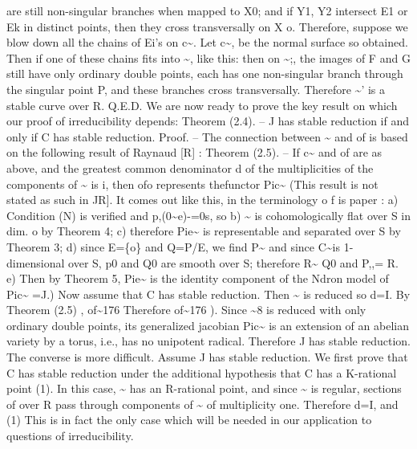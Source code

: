 \documentclass[11pt]{article}
\theoremstyle{plain}
\theoremstyle{definition}
\theoremstyle{remark}
\begin{document}
are still non-singular branches when mapped to X0; and if Y1, Y2 intersect E1 or Ek in distinct points, then they cross transversally on X o. Therefore, suppose we blow down all the chains of Ei's on c\textasciitilde{}. Let c\textasciitilde{}, be the normal surface so obtained. Then if one of these chains fits into \textasciitilde{}, like this: then on \textasciitilde{};, the images of F and G still have only ordinary double points, each has one non-singular branch through the singular point P, and these branches cross transversally. Therefore \textasciitilde{}' is a stable curve over R. Q.E.D. We are now ready to prove the key result on which our proof of irreducibility depends: Theorem (2.4). -- J has stable reduction if and only if C has stable reduction. Proof. -- The connection between \textasciitilde{} and of is based on the following result of Raynaud [R] : Theorem (2.5). -- If c\textasciitilde{} and of are as above, and the greatest common denominator d of the multiplicities of the components of \textasciitilde{} is i, then ofo represents thefunctor Pic\textasciitilde{} (This result is not stated as such in JR]. It comes out like this, in the terminology o f is paper : a) Condition (N) is verified and p,(0\textasciitilde{}e)-=0s, so b) \textasciitilde{} is cohomologically flat over S in dim. o by Theorem 4; c) therefore Pie\textasciitilde{} is representable and separated over S by Theorem 3; d) since E=\{o\} and Q=P/E, we find P\textasciitilde{} and since C\textasciitilde{}is 1-dimensional over S, p0 and Q0 are smooth over S; therefore R\textasciitilde{} Q0 and P,,= R. e) Then by Theorem 5, Pie\textasciitilde{} is the identity component of the Ndron model of Pic\textasciitilde{} =J.) Now assume that C has stable reduction. Then \textasciitilde{} is reduced so d=I. By Theorem (2.5) , of\textasciitilde{}176 Therefore of\textasciitilde{}176 ). Since \textasciitilde{}8 is reduced with only ordinary double points, its generalized jacobian Pic\textasciitilde{} is an extension of an abelian variety by a torus, i.e., has no unipotent radical. Therefore J has stable reduction. The converse is more difficult. Assume J has stable reduction. We first prove that C has stable reduction under the additional hypothesis that C has a K-rational point (1). In this case, \textasciitilde{} has an R-rational point, and since \textasciitilde{} is regular, sections of over R pass through components of \textasciitilde{} of multiplicity one. Therefore d=I, and (1) This is in fact the only case which will be needed in our application to questions of irreducibility.
\end{document}
